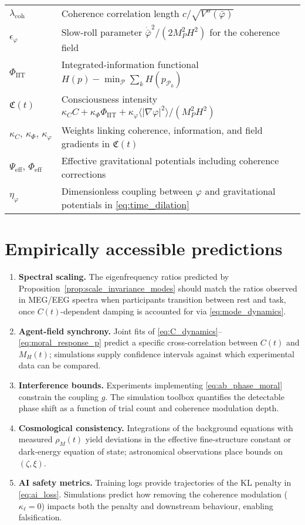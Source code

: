 \documentclass[12pt,a4paper]{article}
\theoremstyle{definition}
\begin{document}
\begin{center}
\begin{tabular}{ll}
$\lambda_{\text{coh}}$ & Coherence correlation length $c/\sqrt{V''(\bar{\varphi})}$ \\
$\epsilon_\varphi$ & Slow-roll parameter $\dot{\bar{\varphi}}^2/(2 M_P^2 H^2)$ for the coherence field \\
$\Phi_{\text{IIT}}$ & Integrated-information functional $H(p) - \min_{\mathcal{P}}\sum_k H(p_{\mathcal{P}_k})$ \\
$\mathfrak{C}(t)$ & Consciousness intensity $\kappa_C C + \kappa_\Phi \Phi_{\text{IIT}} + \kappa_\varphi \langle|\nabla \varphi|^2\rangle/(M_P^2 H^2)$ \\
$\kappa_C,\,\kappa_\Phi,\,\kappa_\varphi$ & Weights linking coherence, information, and field gradients in $\mathfrak{C}(t)$ \\
$\Psi_{\text{eff}},\,\Phi_{\text{eff}}$ & Effective gravitational potentials including coherence corrections \\
$\eta_\varphi$ & Dimensionless coupling between $\varphi$ and gravitational potentials in \eqref{eq:time_dilation} \\
\hline
\end{tabular}
\end{center}

\section{Empirically accessible predictions}

\begin{enumerate}
    \item \textbf{Spectral scaling.} The eigenfrequency ratios predicted by Proposition~\ref{prop:scale_invariance_modes} should match the ratios observed in MEG/EEG spectra when participants transition between rest and task, once $C(t)$-dependent damping is accounted for via \eqref{eq:mode_dynamics}.
    \item \textbf{Agent-field synchrony.} Joint fits of \eqref{eq:C_dynamics}--\eqref{eq:moral_response_p} predict a specific cross-correlation between $C(t)$ and $M_H(t)$; simulations supply confidence intervals against which experimental data can be compared.
    \item \textbf{Interference bounds.} Experiments implementing \eqref{eq:ab_phase_moral} constrain the coupling $g$. The simulation toolbox quantifies the detectable phase shift as a function of trial count and coherence modulation depth.
    \item \textbf{Cosmological consistency.} Integrations of the background equations with measured $\rho_M(t)$ yield deviations in the effective fine-structure constant or dark-energy equation of state; astronomical observations place bounds on $(\zeta,\xi)$.
    \item \textbf{AI safety metrics.} Training logs provide trajectories of the KL penalty in \eqref{eq:ai_loss}. Simulations predict how removing the coherence modulation ($\kappa_\ell = 0$) impacts both the penalty and downstream behaviour, enabling falsification.
\end{enumerate}
\end{document}
